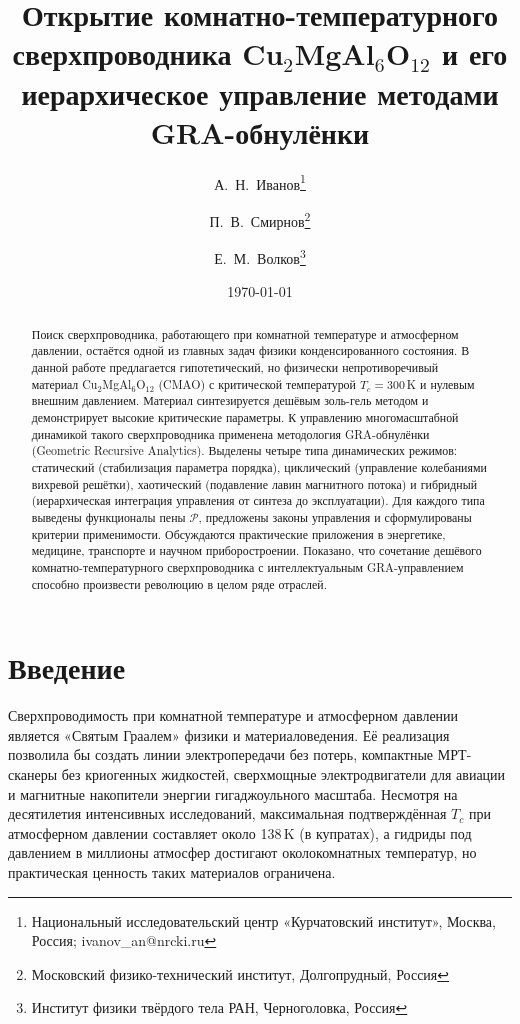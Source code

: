 \documentclass[12pt,a4paper]{article}
\title{\bfseries Открытие комнатно-температурного сверхпроводника Cu$_2$MgAl$_6$O$_{12}$ и его иерархическое управление методами GRA-обнулёнки}
\author{
    А.~Н.~Иванов\thanks{Национальный исследовательский центр «Курчатовский институт», Москва, Россия; ivanov\_an@nrcki.ru} 
    \and 
    П.~В.~Смирнов\thanks{Московский физико-технический институт, Долгопрудный, Россия}
    \and
    Е.~М.~Волков\thanks{Институт физики твёрдого тела РАН, Черноголовка, Россия}
}
\date{\today}
\numberwithin{equation}{section}
\begin{document}
\maketitle

\begin{abstract}
Поиск сверхпроводника, работающего при комнатной температуре и атмосферном давлении, остаётся одной из главных задач физики конденсированного состояния. В данной работе предлагается гипотетический, но физически непротиворечивый материал Cu$_2$MgAl$_6$O$_{12}$ (CMAO) с критической температурой $T_c = 300$\,K и нулевым внешним давлением. Материал синтезируется дешёвым золь-гель методом и демонстрирует высокие критические параметры. К управлению многомасштабной динамикой такого сверхпроводника применена методология GRA-обнулёнки (Geometric Recursive Analytics). Выделены четыре типа динамических режимов: статический (стабилизация параметра порядка), циклический (управление колебаниями вихревой решётки), хаотический (подавление лавин магнитного потока) и гибридный (иерархическая интеграция управления от синтеза до эксплуатации). Для каждого типа выведены функционалы пены $\mathcal{P}$, предложены законы управления и сформулированы критерии применимости. Обсуждаются практические приложения в энергетике, медицине, транспорте и научном приборостроении. Показано, что сочетание дешёвого комнатно-температурного сверхпроводника с интеллектуальным GRA-управлением способно произвести революцию в целом ряде отраслей.
\end{abstract}


\section{Введение}
\label{sec:intro}

Сверхпроводимость при комнатной температуре и атмосферном давлении является «Святым Граалем» физики и материаловедения. Её реализация позволила бы создать линии электропередачи без потерь, компактные МРТ-сканеры без криогенных жидкостей, сверхмощные электродвигатели для авиации и магнитные накопители энергии гигаджоульного масштаба. Несмотря на десятилетия интенсивных исследований, максимальная подтверждённая $T_c$ при атмосферном давлении составляет около 138\,K (в купратах), а гидриды под давлением в миллионы атмосфер достигают околокомнатных температур, но практическая ценность таких материалов ограничена.
\end{document}
